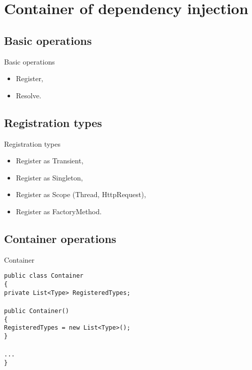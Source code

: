 \documentclass{beamer}
\newcommand{\code}[1]{{\texttt{#1}}}
\begin{document}
\section{Container of dependency injection}

\subsection*{Basic operations}

\begin{frame}{Basic operations}
     \begin{Large}
	\begin{itemize}
		\item Register,
		\item Resolve.
	\end{itemize}
     \end{Large}
\end{frame}

\subsection*{Registration types}

\begin{frame}{Registration types}
     \begin{Large}
	\begin{itemize}
		\item Register as Transient,
		\item Register as Singleton,
		\item Register as Scope (Thread, HttpRequest),
		\item Register as FactoryMethod.
	\end{itemize}
     \end{Large}
\end{frame}

\subsection*{Container operations}

\begin{frame}{Container}
     \begin{large}
	\code{public class Container}\\
	\code{\{}\\ \quad
		\code{private List<Type> RegisteredTypes;}\\ \quad
		\code{}\\ \quad
		\code{public Container()}\\ \quad
		\code{\{}\\ \qquad
		\code{RegisteredTypes = new List<Type>();}\\ \quad
		\code{\}}\\  \quad
		\code{}\\ \quad
		\code{...}\\
	\code{\}}
     \end{large}
\end{frame}
\end{document}

